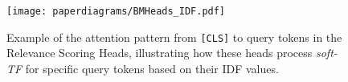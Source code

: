 \begin{figure}[!ht]
    \centering
    \texttt{[image: paperdiagrams/BMHeads\_IDF.pdf]}
    \caption{Example of the attention pattern from \texttt{[CLS]} to query tokens in the Relevance Scoring Heads, illustrating how these heads process \textit{soft-TF} for specific query tokens based on their IDF values.}

    \label{fig:BMHeads_IDF}
\end{figure}